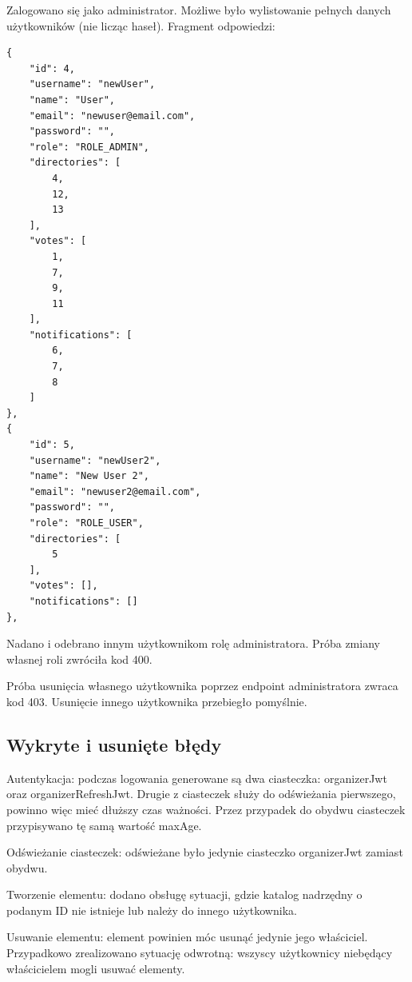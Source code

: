 \documentclass[a4paper,twoside,12pt]{book}
\begin{document}
Zalogowano się jako administrator. Możliwe było wylistowanie pełnych danych użytkowników (nie licząc haseł). Fragment odpowiedzi:
\begin{verbatim}
{
	"id": 4,
	"username": "newUser",
	"name": "User",
	"email": "newuser@email.com",
	"password": "",
	"role": "ROLE_ADMIN",
	"directories": [
		4,
		12,
		13
	],
	"votes": [
		1,
		7,
		9,
		11
	],
	"notifications": [
		6,
		7,
		8
	]
},
{
	"id": 5,
	"username": "newUser2",
	"name": "New User 2",
	"email": "newuser2@email.com",
	"password": "",
	"role": "ROLE_USER",
	"directories": [
		5
	],
	"votes": [],
	"notifications": []
},
\end{verbatim}

Nadano i odebrano innym użytkownikom rolę administratora. Próba zmiany własnej roli zwróciła kod 400.

Próba usunięcia własnego użytkownika poprzez endpoint administratora zwraca kod 403. Usunięcie innego użytkownika przebiegło pomyślnie.

\subsection{Wykryte i usunięte błędy}

Autentykacja: podczas logowania generowane są dwa ciasteczka: organizerJwt oraz organizerRefreshJwt. Drugie z ciasteczek służy do odświeżania pierwszego, powinno więc mieć dłuższy czas ważności. Przez przypadek do obydwu ciasteczek przypisywano tę samą wartość maxAge.

Odświeżanie ciasteczek: odświeżane było jedynie ciasteczko organizerJwt zamiast obydwu. 

Tworzenie elementu: dodano obsługę sytuacji, gdzie katalog nadrzędny o podanym ID nie istnieje lub należy do innego użytkownika.

Usuwanie elementu: element powinien móc usunąć jedynie jego właściciel. Przypadkowo zrealizowano sytuację odwrotną: wszyscy użytkownicy niebędący właścicielem mogli usuwać elementy.
\end{document}
